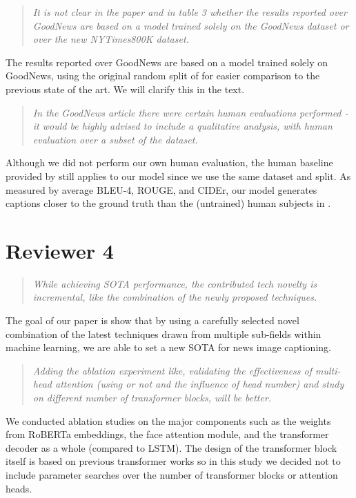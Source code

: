 \documentclass[10pt,twocolumn,letterpaper]{article}
\newcommand{\eat}[1]{{}}
\begin{document}
\begin{quote}\textit{It is not clear in the paper and in table 3 whether the
results reported over GoodNews are based on a model trained solely on the
GoodNews dataset or over the new NYTimes800K dataset.}
\end{quote}
The results reported over GoodNews are based on a model trained solely on
GoodNews, using the original random split of \cite{Biten2019GoodNews} for
easier comparison to the previous state of the art. We will clarify this in the
text.


\begin{quote}\textit{In the GoodNews article there were certain human
evaluations performed - it would be highly advised to include a qualitative
analysis, with human evaluation over a subset of the dataset.}
\end{quote}
Although we did not perform our own human evaluation, the human baseline
provided by \cite{Biten2019GoodNews} still applies to our model since we use the
same dataset and split. As measured by average BLEU-4, ROUGE, and CIDEr, our
model generates captions closer to the ground truth than the (untrained) human
subjects in \cite{Biten2019GoodNews}.

\section{Reviewer 4}

\begin{quote}\textit{While achieving SOTA performance, the contributed tech
novelty is incremental, like the combination of the newly proposed techniques.}
\end{quote}
The goal of our paper is show that by using a carefully selected novel
combination of the latest techniques drawn from multiple sub-fields within
machine learning, we are able to set a new SOTA for news image captioning.

\eat{
We do not claim to have invented a new technique. The goal of this paper is to
show that a careful combination of the latest techniques is enough to set a
very strong SOTA for the news image captioning task.
}

\begin{quote}\textit{Adding the ablation experiment like, validating the
effectiveness of multi-head attention (using or not and the influence of head
number) and study on different number of transformer blocks, will be better.}
\end{quote}
We conducted ablation studies on the major components such as the weights from
RoBERTa embeddings, the face attention module, and the transformer decoder as a
whole (compared to LSTM). The design of the transformer block itself is based
on previous transformer works so in this study we decided not to include
parameter searches over the number of transformer blocks or attention heads.
\end{document}
